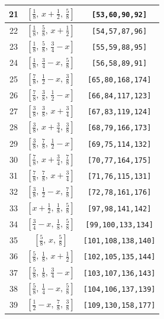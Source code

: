 \documentclass[fleqn,8pt]{jsarticle}
\begin{document}
\begin{longtable}{ccc}
21 & $\left[ \frac{1}{8},\, x + \frac{1}{2},\, \frac{5}{8} \right]$ & {\tt [53,60,90,92]} \\ \hline
22 & $\left[ \frac{1}{8},\, \frac{5}{8},\, x + \frac{1}{2} \right]$ & {\tt [54,57,87,96]} \\ \hline
23 & $\left[ \frac{1}{8},\, \frac{5}{8},\, \frac{3}{4} - x \right]$ & {\tt [55,59,88,95]} \\ \hline
24 & $\left[ \frac{1}{8},\, \frac{3}{4} - x,\, \frac{5}{8} \right]$ & {\tt [56,58,89,91]} \\ \hline
25 & $\left[ \frac{7}{8},\, \frac{1}{2} - x,\, \frac{3}{8} \right]$ & {\tt [65,80,168,174]} \\ \hline
26 & $\left[ \frac{7}{8},\, \frac{3}{8},\, \frac{1}{2} - x \right]$ & {\tt [66,84,117,123]} \\ \hline
27 & $\left[ \frac{3}{8},\, \frac{3}{8},\, x + \frac{3}{4} \right]$ & {\tt [67,83,119,124]} \\ \hline
28 & $\left[ \frac{3}{8},\, x + \frac{3}{4},\, \frac{3}{8} \right]$ & {\tt [68,79,166,173]} \\ \hline
29 & $\left[ \frac{3}{8},\, \frac{7}{8},\, \frac{1}{2} - x \right]$ & {\tt [69,75,114,132]} \\ \hline
30 & $\left[ \frac{7}{8},\, x + \frac{3}{4},\, \frac{7}{8} \right]$ & {\tt [70,77,164,175]} \\ \hline
31 & $\left[ \frac{7}{8},\, \frac{7}{8},\, x + \frac{3}{4} \right]$ & {\tt [71,76,115,131]} \\ \hline
32 & $\left[ \frac{3}{8},\, \frac{1}{2} - x,\, \frac{7}{8} \right]$ & {\tt [72,78,161,176]} \\ \hline
33 & $\left[ x + \frac{1}{2},\, \frac{1}{8},\, \frac{5}{8} \right]$ & {\tt [97,98,141,142]} \\ \hline
34 & $\left[ \frac{3}{4} - x,\, \frac{1}{8},\, \frac{5}{8} \right]$ & {\tt [99,100,133,134]} \\ \hline
35 & $\left[ \frac{5}{8},\, x,\, \frac{5}{8} \right]$ & {\tt [101,108,138,140]} \\ \hline
36 & $\left[ \frac{5}{8},\, \frac{1}{8},\, x + \frac{1}{2} \right]$ & {\tt [102,105,135,144]} \\ \hline
37 & $\left[ \frac{5}{8},\, \frac{1}{8},\, \frac{3}{4} - x \right]$ & {\tt [103,107,136,143]} \\ \hline
38 & $\left[ \frac{5}{8},\, \frac{1}{4} - x,\, \frac{5}{8} \right]$ & {\tt [104,106,137,139]} \\ \hline
39 & $\left[ \frac{1}{2} - x,\, \frac{7}{8},\, \frac{3}{8} \right]$ & {\tt [109,130,158,177]} \\ \hline

\end{longtable}
\end{document}
